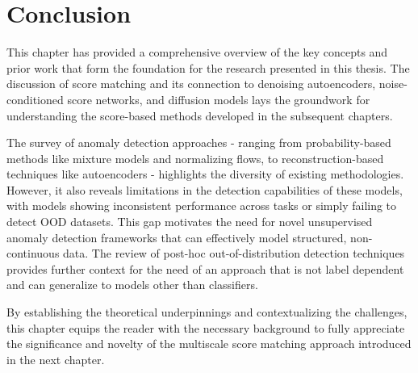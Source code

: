 \section{Conclusion}
This chapter has provided a comprehensive overview of the key concepts and prior work that form the foundation for the research presented in this thesis. The discussion of score matching and its connection to denoising autoencoders, noise-conditioned score networks, and diffusion models lays the groundwork for understanding the score-based methods developed in the subsequent chapters.

The survey of anomaly detection approaches - ranging from probability-based methods like mixture models and normalizing flows, to reconstruction-based techniques like autoencoders - highlights the diversity of existing methodologies. However, it also reveals limitations in the detection capabilities of these models, with models showing inconsistent performance across tasks or simply failing to detect OOD datasets. This gap motivates the need for novel unsupervised anomaly detection frameworks that can effectively model structured, non-continuous data. The review of post-hoc out-of-distribution detection techniques provides further context for the need of an approach that is not label dependent and can generalize to models other than classifiers. 

By establishing the theoretical underpinnings and contextualizing the challenges, this chapter equips the reader with the necessary background to fully appreciate the significance and novelty of the multiscale score matching approach introduced in the next chapter.



